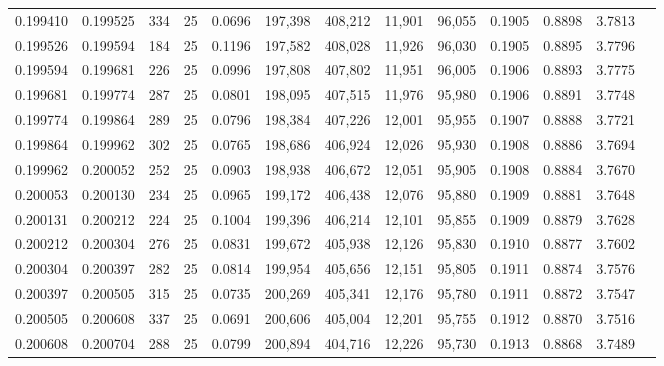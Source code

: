 \begin{tabular}{rrrrrrrrrrrrr}
0.199410 & 0.199525 &   334 &  25 &                                     0.0696 & 197,398 & 408,212 &  11,901 &  96,055 & 0.1905 & 0.8898 & 3.7813 \\
0.199526 & 0.199594 &   184 &  25 &                                     0.1196 & 197,582 & 408,028 &  11,926 &  96,030 & 0.1905 & 0.8895 & 3.7796 \\
0.199594 & 0.199681 &   226 &  25 &                                     0.0996 & 197,808 & 407,802 &  11,951 &  96,005 & 0.1906 & 0.8893 & 3.7775 \\
0.199681 & 0.199774 &   287 &  25 &                                     0.0801 & 198,095 & 407,515 &  11,976 &  95,980 & 0.1906 & 0.8891 & 3.7748 \\
0.199774 & 0.199864 &   289 &  25 &                                     0.0796 & 198,384 & 407,226 &  12,001 &  95,955 & 0.1907 & 0.8888 & 3.7721 \\
0.199864 & 0.199962 &   302 &  25 &                                     0.0765 & 198,686 & 406,924 &  12,026 &  95,930 & 0.1908 & 0.8886 & 3.7694 \\
0.199962 & 0.200052 &   252 &  25 &                                     0.0903 & 198,938 & 406,672 &  12,051 &  95,905 & 0.1908 & 0.8884 & 3.7670 \\
0.200053 & 0.200130 &   234 &  25 &                                     0.0965 & 199,172 & 406,438 &  12,076 &  95,880 & 0.1909 & 0.8881 & 3.7648 \\
0.200131 & 0.200212 &   224 &  25 &                                     0.1004 & 199,396 & 406,214 &  12,101 &  95,855 & 0.1909 & 0.8879 & 3.7628 \\
0.200212 & 0.200304 &   276 &  25 &                                     0.0831 & 199,672 & 405,938 &  12,126 &  95,830 & 0.1910 & 0.8877 & 3.7602 \\
0.200304 & 0.200397 &   282 &  25 &                                     0.0814 & 199,954 & 405,656 &  12,151 &  95,805 & 0.1911 & 0.8874 & 3.7576 \\
0.200397 & 0.200505 &   315 &  25 &                                     0.0735 & 200,269 & 405,341 &  12,176 &  95,780 & 0.1911 & 0.8872 & 3.7547 \\
0.200505 & 0.200608 &   337 &  25 &                                     0.0691 & 200,606 & 405,004 &  12,201 &  95,755 & 0.1912 & 0.8870 & 3.7516 \\
0.200608 & 0.200704 &   288 &  25 &                                     0.0799 & 200,894 & 404,716 &  12,226 &  95,730 & 0.1913 & 0.8868 & 3.7489 \\

\end{tabular}
